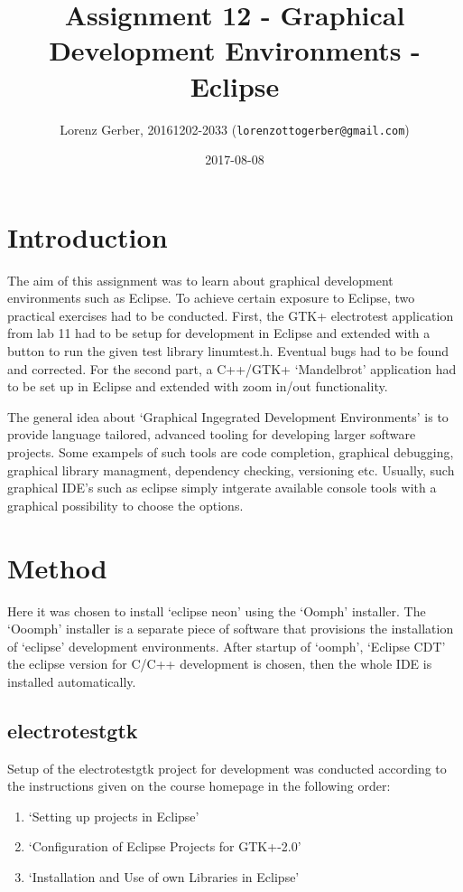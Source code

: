 \documentclass[a4paper,11pt,twoside]{article}
\title{Assignment 12 - Graphical Development Environments - Eclipse }
\author{Lorenz Gerber, 20161202-2033 ({\tt{lorenzottogerber@gmail.com}})}
\date{2017-08-08}
\begin{document}
\lstset{language=C}
\maketitle
\thispagestyle{empty}
\newpage

\clearpage
{}

\section{Introduction} The aim of this assignment was to learn about graphical
development environments such as Eclipse. To achieve certain exposure to
Eclipse, two practical exercises had to be conducted. First, the GTK+
electrotest application from lab 11 had to be setup for development in Eclipse
and extended with a button to run the given test library linumtest.h. Eventual
bugs had to be found and corrected. For the second part, a C++/GTK+ `Mandelbrot'
application had to be set up in Eclipse and extended with zoom in/out
functionality.

The general idea about `Graphical Ingegrated Development Environments' is to
provide language tailored, advanced tooling for developing larger software
projects. Some exampels of such tools are code completion, graphical debugging,
graphical library managment, dependency checking, versioning etc. Usually, such
graphical IDE's such as eclipse simply intgerate available console tools with a
graphical possibility to choose the options.

\section{Method}
Here it was chosen to install `eclipse neon' using the `Oomph' installer. The `Ooomph'
installer is a separate piece of software that provisions the installation of
`eclipse' development environments. After startup of `oomph', `Eclipse CDT' the
eclipse version for C/C++ development is chosen, then the whole IDE is installed
automatically.

\subsection{electrotestgtk}
Setup of the electrotestgtk project for development was conducted according to the
instructions given on the course homepage in the following order:
\begin{enumerate}
  \item `Setting up projects in Eclipse'
  \item `Configuration of Eclipse Projects for GTK+-2.0'
  \item `Installation and Use of own Libraries in Eclipse'
\end{enumerate}
\end{document}

